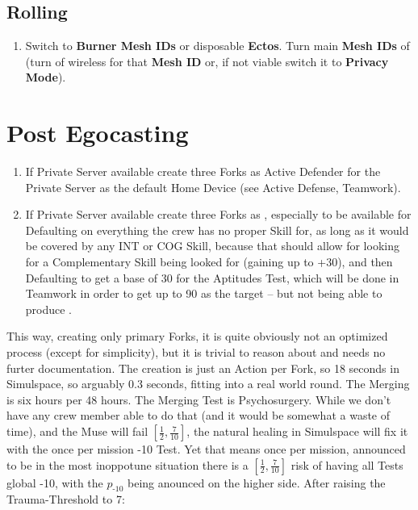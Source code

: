 \subsection{Rolling}

\begin{enumerate}
    \item Switch to \textbf{\glspl{Burner Mesh ID}} or disposable \textbf{\glspl{Ecto}}. Turn main \textbf{\glspl{Mesh ID}} of (turn of wireless for that \textbf{\gls{Mesh ID}} or, if not viable switch it to \textbf{\gls{Privacy Mode}}).
\end{enumerate}


\section{Post Egocasting}

\begin{enumerate}
    \item If \gls{Private Server} available create three \glspl{Fork} as \gls{Active Defender} for the \gls{Private Server} as the default \gls{Home Device} (see \gls{Active Defense}, \gls{Teamwork}).
    \item If \gls{Private Server} available create three \glspl{Fork} as , especially to be available for \gls{Defaulting} on everything the crew has no proper Skill for, as long as it would be covered by any INT or COG Skill, because that should allow for looking for a \gls{Complementary Skill} being looked for (gaining up to +30), and then \gls{Defaulting} to get a base of 30 for the Aptitudes Test, which will be done in \gls{Teamwork} in order to get up to 90 as the target -- but not being able to produce .
\end{enumerate}

This way, creating only primary \glspl{Fork}, it is quite obviously not an optimized process (except for simplicity), but it is trivial to reason about and needs no furter documentation. The creation is just an Action per \gls{Fork}, so 18 seconds in Simulspace, so arguably 0.3 seconds, fitting into a real world round. The Merging is six hours per 48 hours. The Merging Test is Psychosurgery. While we don't have any crew member able to do that (and it would be somewhat a waste of time), and the Muse will fail $\left[\frac{1}{2}, \frac{7}{10}\right]$, the natural healing in Simulspace will fix it with the once per mission -10 Test. Yet that means once per mission, announced to be in the most inoppotune situation there is a $\left[\frac{1}{2}, \frac{7}{10}\right]$ risk of having all Tests global -10, with the $p_{\text{-10}}$ being anounced on the higher side. After raising the Trauma-Threshold to 7:

